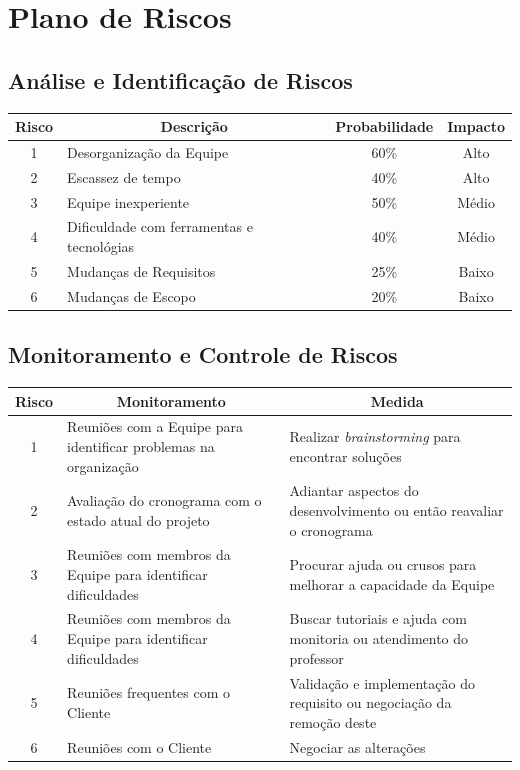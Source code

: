\documentclass[a4paper,12pt]{article}
\begin{document}
{\newpage
\section{Plano de Riscos}

\subsection{Análise e Identificação de Riscos}

{\normalsize

\begin{longtable}{|c|l|c|c|}
\hline


\multicolumn{1}{|c|}{\textbf{Risco}}  & \multicolumn{1}{c|}{\textbf{Descrição}} & \multicolumn{1}{c|}{\textbf{Probabilidade}} & \multicolumn{1}{c|}{\textbf{Impacto}} \\
\hline
1	& Desorganização da Equipe & 60\% & Alto \\
\hline
2	& Escassez de tempo & 40\% & Alto \\
\hline
3	& Equipe inexperiente	& 50\% & Médio \\
\hline
4	& Dificuldade com ferramentas e tecnológias		& 40\%	& Médio \\
\hline
5	& Mudanças de Requisitos		& 25\%	& Baixo \\
\hline
6	& Mudanças de Escopo		& 20\%	& Baixo \\
\hline
\end{longtable}
}

\subsection{Monitoramento e Controle de Riscos}

{\normalsize

\begin{longtable}{|c|p{6cm}|p{6.5cm}|}
\hline

\multicolumn{1}{|c|}{\textbf{Risco}}  & \multicolumn{1}{c|}{\textbf{Monitoramento}} & \multicolumn{1}{c|}{\textbf{Medida}} \\
\hline
1	  & Reuniões com a Equipe para identificar problemas na organização & Realizar \textit{brainstorming} para encontrar soluções\\
\hline
2	& Avaliação do cronograma com o estado atual do projeto & Adiantar aspectos do desenvolvimento ou então reavaliar o cronograma\\
\hline
3	& Reuniões com membros da Equipe para identificar dificuldades	& Procurar ajuda ou crusos para melhorar a capacidade da Equipe\\
\hline
4	& Reuniões com membros da Equipe para identificar dificuldades	& Buscar tutoriais e ajuda com monitoria ou atendimento do professor\\
\hline
5	& Reuniões frequentes com o Cliente	& Validação e implementação do requisito ou negociação da remoção deste\\
\hline
6	& Reuniões com o Cliente	& Negociar as alterações\\
\hline
\end{longtable}
}





}
\end{document}
